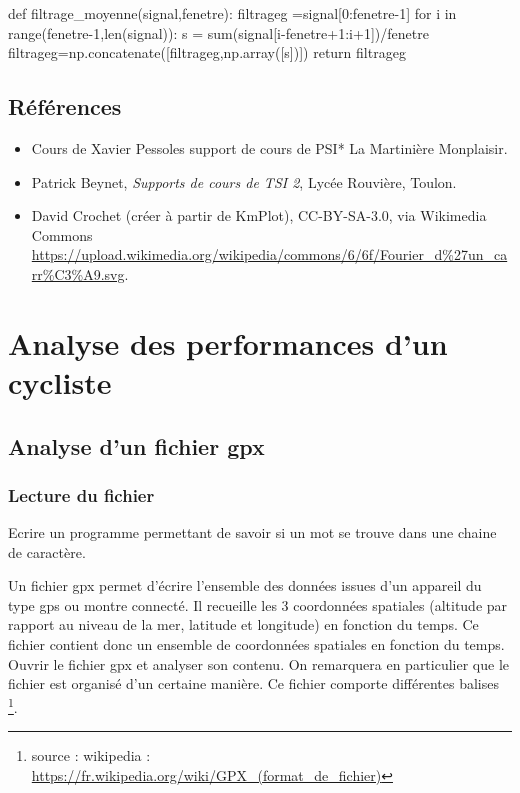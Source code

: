 \begin{pyverbatim}
def filtrage_moyenne(signal,fenetre):
    filtrageg =signal[0:fenetre-1]
    for i in range(fenetre-1,len(signal)):
        s = sum(signal[i-fenetre+1:i+1])/fenetre
        filtrageg=np.concatenate([filtrageg,np.array([s])])
    return filtrageg
\end{pyverbatim}

\subsection*{Références} 
\begin{itemize}
\item Cours de Xavier Pessoles support de cours de  PSI* La Martinière Monplaisir.
\item Patrick Beynet, \textit{Supports de cours de TSI 2}, Lycée Rouvière, Toulon.
\item David Crochet (créer à partir de KmPlot), CC-BY-SA-3.0, via Wikimedia Commons \url{https://upload.wikimedia.org/wikipedia/commons/6/6f/Fourier_d\%27un_carr\%C3\%A9.svg}.
\end{itemize}

\section*{Analyse des performances d'un cycliste}

\subsection*{Analyse d'un fichier gpx}

\subsubsection*{Lecture du fichier}

 
\question{} Ecrire un programme permettant de savoir si un mot se trouve dans une chaine de caractère.

Un fichier gpx permet d'écrire l'ensemble des données issues d'un appareil du type gps ou montre connecté. Il recueille les 3 coordonnées spatiales (altitude par rapport au niveau de la mer, latitude et longitude) en fonction du temps. Ce fichier contient donc un ensemble de coordonnées spatiales en fonction du temps.
Ouvrir le fichier gpx et analyser son contenu.
On remarquera en particulier que le fichier est organisé d'un certaine manière. Ce fichier comporte différentes balises \footnote{source : wikipedia : \url{https://fr.wikipedia.org/wiki/GPX_(format_de_fichier)}}.

